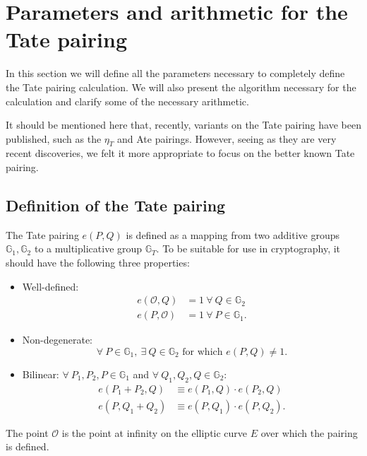 \section{Parameters and arithmetic for the Tate pairing\label{section-pairings}}

In this section we will define all the parameters necessary to completely define the Tate pairing calculation. We will also present the algorithm necessary for the calculation and clarify some of the necessary arithmetic.

It should be mentioned here that, recently, variants on the Tate pairing have been published, such as the $\eta_T$ \cite{eta} and Ate \cite{ate} pairings. However, seeing as they are very recent discoveries, we felt it more appropriate to focus on the better known Tate pairing.

\subsection{Definition of the Tate pairing}

The Tate pairing $e(P, Q)$ is defined as a mapping from two additive groups $\mathbb{G}_1, \mathbb{G}_2$ to a multiplicative group $\mathbb{G}_T$. To be suitable for use in cryptography, it should have the following three properties:
\begin{itemize}
	\item Well-defined:%
		\begin{displaymath}\begin{aligned}
			e(\mathcal{O}, Q) &= 1 \: \forall \: Q \in \mathbb{G}_2\\
			e(P, \mathcal{O}) &= 1 \: \forall \: P \in \mathbb{G}_1.
		\end{aligned}\end{displaymath}
	
	\item Non-degenerate:%
		\begin{displaymath}\forall \: P \in \mathbb{G}_1, \: \exists \: Q \in \mathbb{G}_2 \text{ for which } e(P, Q) \neq 1.\end{displaymath}
	
	\item Bilinear: $\forall \: P_1, P_2, P \in \mathbb{G}_1$ and $\forall \: Q_1, Q_2, Q \in \mathbb{G}_2$:%
		\begin{displaymath}\begin{aligned}
			e(P_1 + P_2, Q) &\equiv e(P_1, Q) \cdot e(P_2, Q)\\
			e(P, Q_1 + Q_2) &\equiv e(P, Q_1) \cdot e(P, Q_2).
		\end{aligned}\end{displaymath}
\end{itemize}
The point $\mathcal{O}$ is the point at infinity on the elliptic curve $E$ over which the pairing is defined.

